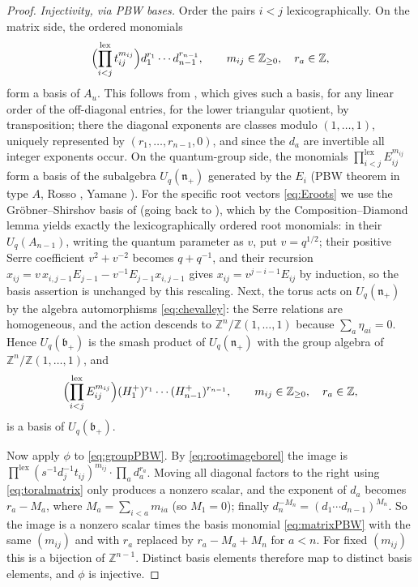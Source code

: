 \documentclass[12pt]{article}
\theoremstyle{remark}
\newcommand{\U}{U_q}
\newcommand{\bp}{\mathfrak b_+}
\newcommand{\np}{\mathfrak n_+}
\begin{document}
\begin{proof}
\emph{Injectivity, via PBW bases.} Order the pairs $i<j$
lexicographically. On the matrix side, the ordered monomials
\begin{equation}\label{eq:matrixPBW}
 \Bigl(\prod_{i<j}^{\mathrm{lex}}t_{ij}^{m_{ij}}\Bigr)
 d_1^{r_1}\cdots d_{n-1}^{r_{n-1}},
 \qquad m_{ij}\in\mathbb Z_{\ge0},\quad r_a\in\mathbb Z,
\end{equation}
form a basis of $A_u$. This follows from \cite[Proposition 3.10]{LY},
which gives such a basis, for any linear order of the off-diagonal
entries, for the lower triangular quotient, by transposition; there the
diagonal exponents are classes modulo $(1,\dots,1)$, uniquely
represented by $(r_1,\dots,r_{n-1},0)$, and since the $d_a$ are
invertible all integer exponents occur.
On the quantum-group side, the monomials
$\prod^{\mathrm{lex}}_{i<j}E_{ij}^{m_{ij}}$ form a basis of the
subalgebra $\U(\np)$ generated by the $E_i$ (PBW theorem in type $A$,
Rosso \cite{Ro}, Yamane \cite{Ya}). For the specific root vectors
\eqref{eq:Eroots} we use the Gr\"obner--Shirshov basis of
\cite[Theorem 3.1]{CSS} (going back to \cite{BM}), which by the
Composition--Diamond lemma \cite[Lemma 2.4]{CSS} yields exactly the
lexicographically ordered root monomials: in their $U_q(A_{n-1})$,
writing the quantum parameter as $v$, put $v=q^{1/2}$; their positive
Serre coefficient $v^2+v^{-2}$ becomes $q+q^{-1}$, and their recursion
$x_{ij}=v\,x_{i,j-1}E_{j-1}-v^{-1}E_{j-1}x_{i,j-1}$ gives
$x_{ij}=v^{j-i-1}E_{ij}$ by induction, so the basis assertion is
unchanged by this rescaling. Next, the torus acts on $\U(\np)$ by the
algebra automorphisms \eqref{eq:chevalley}: the Serre relations are
homogeneous, and the action descends to
$\mathbb Z^n/\mathbb Z(1,\dots,1)$ because $\sum_a\eta_{ai}=0$. Hence
$\U(\bp)$ is the smash product of $\U(\np)$ with the group algebra of
$\mathbb Z^n/\mathbb Z(1,\dots,1)$, and
\begin{equation}\label{eq:groupPBW}
 \Bigl(\prod_{i<j}^{\mathrm{lex}}E_{ij}^{m_{ij}}\Bigr)
 (H^+_1)^{r_1}\cdots(H^+_{n-1})^{r_{n-1}},
 \qquad m_{ij}\in\mathbb Z_{\ge0},\quad r_a\in\mathbb Z,
\end{equation}
is a basis of $\U(\bp)$.

Now apply $\phi$ to \eqref{eq:groupPBW}. By
\eqref{eq:rootimageborel} the image is
$\prod^{\mathrm{lex}}(s^{-1}d_j^{-1}t_{ij})^{m_{ij}}\cdot\prod_a d_a^{r_a}$.
Moving all diagonal factors to the right using \eqref{eq:toralmatrix}
only produces a nonzero scalar, and the exponent of $d_a$ becomes
$r_a-M_a$, where $M_a=\sum_{i<a}m_{ia}$ (so $M_1=0$); finally
$d_n^{-M_n}=(d_1\cdots d_{n-1})^{M_n}$. So the image is a nonzero
scalar times the basis monomial \eqref{eq:matrixPBW} with the same
$(m_{ij})$ and with $r_a$ replaced by $r_a-M_a+M_n$ for $a<n$. For
fixed $(m_{ij})$ this is a bijection of $\mathbb Z^{n-1}$. Distinct
basis elements therefore map to distinct basis elements, and $\phi$ is
injective.


\end{proof}
\end{document}
